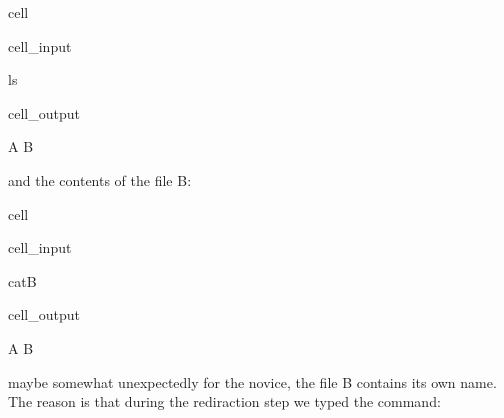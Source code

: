 \documentclass[a4paper,10pt,english]{jupyterBook}
\begin{document}
\begin{sphinxuseclass}{cell}\begin{sphinxVerbatimInput}

\begin{sphinxuseclass}{cell_input}
\begin{sphinxVerbatim}[commandchars=\\\{\}]
ls
\end{sphinxVerbatim}

\end{sphinxuseclass}\end{sphinxVerbatimInput}
\begin{sphinxVerbatimOutput}

\begin{sphinxuseclass}{cell_output}
\begin{sphinxVerbatim}[commandchars=\\\{\}]
A  B
\end{sphinxVerbatim}

\end{sphinxuseclass}\end{sphinxVerbatimOutput}

\end{sphinxuseclass}
\sphinxAtStartPar
and the contents of the file B:

\begin{sphinxuseclass}{cell}\begin{sphinxVerbatimInput}

\begin{sphinxuseclass}{cell_input}
\begin{sphinxVerbatim}[commandchars=\\\{\}]
catB
\end{sphinxVerbatim}

\end{sphinxuseclass}\end{sphinxVerbatimInput}
\begin{sphinxVerbatimOutput}

\begin{sphinxuseclass}{cell_output}
\begin{sphinxVerbatim}[commandchars=\\\{\}]
A
B
\end{sphinxVerbatim}

\end{sphinxuseclass}\end{sphinxVerbatimOutput}

\end{sphinxuseclass}
\sphinxAtStartPar
maybe somewhat unexpectedly for the novice, the file B contains its own name. The reason is that during the rediraction step we typed the command:
\end{document}
